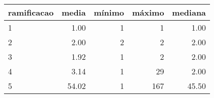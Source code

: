 \begin{table}[ht]
\centering
\begin{tabular}{lrrrr}
  \hline
ramificacao & media & mínimo & máximo & mediana \\ 
  \hline
1 & 1.00 &   1 &   1 & 1.00 \\ 
  2 & 2.00 &   2 &   2 & 2.00 \\ 
  3 & 1.92 &   1 &   2 & 2.00 \\ 
  4 & 3.14 &   1 &  29 & 2.00 \\ 
  5 & 54.02 &   1 & 167 & 45.50 \\ 
   \hline
\end{tabular}
\end{table}
